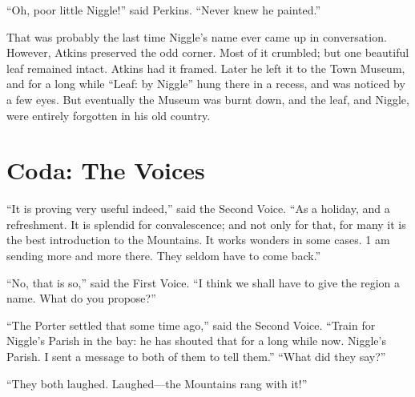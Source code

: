 \documentclass[english]{scrartcl}
\begin{document}
“Oh, poor little Niggle!” said Perkins. “Never knew he painted.”

That was probably the last time Niggle’s name ever came up in conversation. However, Atkins preserved the odd corner. Most of it crumbled; but one beautiful leaf remained intact. Atkins had it framed. Later he left it to the Town Museum, and for a long while “Leaf: by Niggle” hung there in a recess, and was noticed by a few eyes. But eventually the Museum was burnt down, and the leaf, and Niggle, were entirely forgotten in his old country.

\section*{Coda: The Voices}

“It is proving very useful indeed,” said the Second Voice. “As a holiday, and a refreshment. It is splendid for convalescence; and not only for that, for many it is the best introduction to the Mountains. It works wonders in some cases. 1 am sending more and more there. They seldom have to come back.”

“No, that is so,” said the First Voice. “I think we shall have to give the region a name. What do you propose?”

“The Porter settled that some time ago,” said the Second Voice. “Train for Niggle’s Parish in the bay: he has shouted that for a long while now. Niggle’s Parish. I sent a message to both of them to tell them.” “What did they say?”

“They both laughed. Laughed—the Mountains rang with it!”
\end{document}

